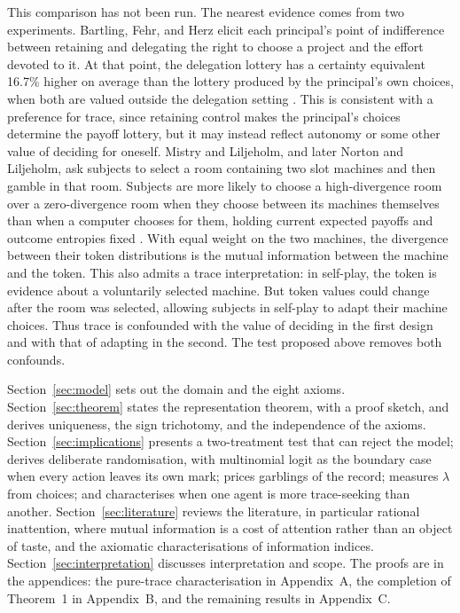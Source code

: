 \documentclass[11pt,a4paper]{article}
\theoremstyle{definition}
\newcommand{\1}{\mathbf 1}
\begin{document}
This comparison has not been run.  The nearest evidence comes from two experiments.  Bartling, Fehr, and Herz elicit each principal's point of indifference between retaining and delegating the right to choose a project and the effort devoted to it.  At that point, the delegation lottery has a certainty equivalent 16.7\% higher on average than the lottery produced by the principal's own choices, when both are valued outside the delegation setting \cite{BartlingFehrHerz2014}.  This is consistent with a preference for trace, since retaining control makes the principal's choices determine the payoff lottery, but it may instead reflect autonomy or some other value of deciding for oneself.  Mistry and Liljeholm, and later Norton and Liljeholm, ask subjects to select a room containing two slot machines and then gamble in that room.  Subjects are more likely to choose a high-divergence room over a zero-divergence room when they choose between its machines themselves than when a computer chooses for them, holding current expected payoffs and outcome entropies fixed \cite{MistryLiljeholm2016,NortonLiljeholm2020}.  With equal weight on the two machines, the divergence between their token distributions is the mutual information between the machine and the token.  This also admits a trace interpretation: in self-play, the token is evidence about a voluntarily selected machine.  But token values could change after the room was selected, allowing subjects in self-play to adapt their machine choices.  Thus trace is confounded with the value of deciding in the first design and with that of adapting in the second.  The test proposed above removes both confounds.

Section~\ref{sec:model} sets out the domain and the eight axioms.  Section~\ref{sec:theorem} states the representation theorem,
with a proof sketch, and derives uniqueness, the sign trichotomy, and the
independence of the axioms.
Section~\ref{sec:implications} presents a two-treatment test that can reject the model; derives deliberate randomisation, with multinomial logit as the boundary case when every action leaves its own mark; prices garblings of the record; measures $\lambda$ from choices; and characterises when one agent is more trace-seeking than another.
Section~\ref{sec:literature} reviews the literature, in particular rational inattention, where mutual information is a cost of attention rather than an object of
taste, and the axiomatic characterisations of information indices.
Section~\ref{sec:interpretation} discusses interpretation and scope.  The proofs are in the appendices:
the pure-trace characterisation in Appendix~A, the completion of Theorem~1 in Appendix~B, and the remaining
results in Appendix~C.  %
\end{document}
